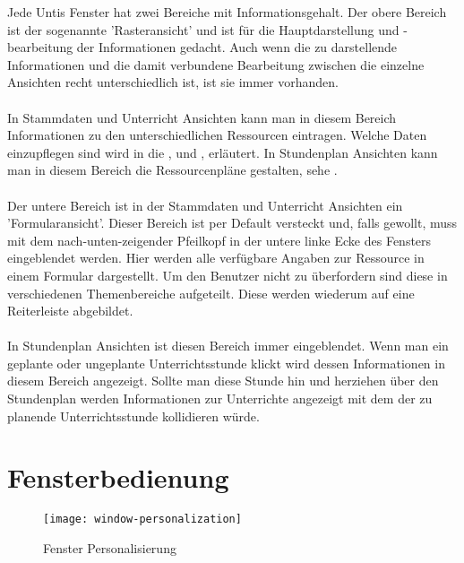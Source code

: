 Jede Untis Fenster hat zwei Bereiche mit Informationsgehalt. Der obere Bereich ist der sogenannte 'Rasteransicht' und ist für die Hauptdarstellung und -bearbeitung der Informationen gedacht. Auch wenn die zu darstellende Informationen und die damit verbundene Bearbeitung zwischen die einzelne Ansichten recht unterschiedlich ist, ist sie immer vorhanden.\\
\\
In Stammdaten und Unterricht Ansichten kann man in diesem Bereich Informationen zu den unterschiedlichen Ressourcen eintragen. Welche Daten einzupflegen sind wird in die , und , erläutert. In Stundenplan Ansichten kann man in diesem Bereich die Ressourcenpläne gestalten, sehe .\\
\\
Der untere Bereich ist in der Stammdaten und Unterricht Ansichten ein 'Formularansicht'. Dieser Bereich ist per Default versteckt und, falls gewollt, muss mit dem nach-unten-zeigender Pfeilkopf in der untere linke Ecke des Fensters eingeblendet werden. Hier werden alle verfügbare Angaben zur Ressource in einem Formular dargestellt. Um den Benutzer nicht zu überfordern sind diese in verschiedenen Themenbereiche aufgeteilt. Diese werden wiederum auf eine Reiterleiste abgebildet.\\
\\
In Stundenplan Ansichten ist diesen Bereich immer eingeblendet. Wenn man ein geplante oder ungeplante Unterrichtsstunde klickt wird dessen Informationen in diesem Bereich angezeigt. Sollte man diese Stunde hin und herziehen über den Stundenplan werden Informationen zur Unterrichte angezeigt mit dem der zu planende Unterrichtsstunde kollidieren würde.\\

\section{Fensterbedienung}

\begin{wrapfigure}{r}{0.4\textwidth}
	\vspace{-14pt}
	\texttt{[image: window-personalization]}
	\vspace{-5pt}
	\caption{Fenster Personalisierung}
	\label{fig:window-personalization}
\end{wrapfigure}

